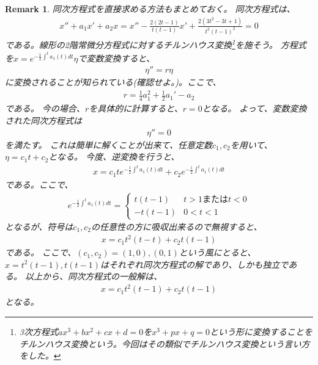 \documentclass{jsarticle}
\newtheorem{remark}{Remark}
\begin{document}
\begin{remark}
同次方程式を直接求める方法もまとめておく。
同次方程式は、
\begin{align}
x''+a_{1}x'+a_{2}x=x''-\frac{2(2t-1)}{t(t-1)}x'+\frac{2(3t^{2}-3t+1)}{t^{2}(t-1)^{2}}=0
\end{align}
である。線形の2階常微分方程式に対するチルンハウス変換\footnote{3次方程式$ax^{3}+bx^{2}+cx+d=0$を$x^{3}+px+q=0$という形に変換することをチルンハウス変換という。今回はその類似でチルンハウス変換という言い方をした。}を施そう。
方程式を$x=e^{-\frac{1}{2}\int^{t} a_{1}(t)dt}\eta$で変数変換すると、
\begin{align}
\eta''=r\eta
\end{align}
に変換されることが知られている(確認せよ。)。ここで、
\begin{align}
r=\frac{1}{4}a_{1}^{2}+\frac{1}{2}a_{1}'-a_{2}
\end{align}
である。
今の場合、$r$を具体的に計算すると、$r=0$となる。
よって、変数変換された同次方程式は
\begin{align}
\eta''=0
\end{align}
を満たす。
これは簡単に解くことが出来て、任意定数$c_{1},c_{2}$を用いて、
$\eta=c_{1}t+c_{2}$となる。
今度、逆変換を行うと、
\begin{align}
x=c_{1}te^{-\frac{1}{2}\int^{t} a_{1}(t)dt}+c_{2}e^{-\frac{1}{2}\int^{t} a_{1}(t)dt}
\end{align}
である。ここで、
\begin{align}
e^{-\frac{1}{2}\int^{t} a_{1}(t)dt}=
\begin{cases}
t(t-1) & \text{$t>1$または$t<0$}\\
-t(t-1) & \text{$0<t<1$}
\end{cases}
\end{align}
となるが、符号は$c_{1},c_{2}$の任意性の方に吸収出来るので無視すると、
\begin{align}
x=c_{1}t^{2}(t-t)+c_{2}t(t-1)
\end{align}
である。
ここで、$(c_{1},c_{2})=(1,0),(0,1)$という風にとると、
$x=t^{2}(t-1),t(t-1)$はそれぞれ同次方程式の解であり、しかも独立である。
以上から、同次方程式の一般解は、
\begin{align}
x=c_{1}t^{2}(t-1)+c_{2}t(t-1)
\end{align}
となる。
\end{remark}
\end{document}
